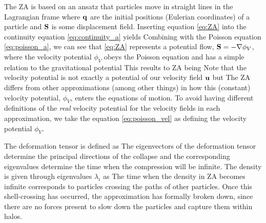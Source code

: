 The ZA is based on an ansatz that particles move in straight lines in the Lagrangian frame
where $\mathbf q$ are the initial positions (Eulerian coordinates) of a particle and $\mathbf S$ is some displacement field. Inserting equation \eqref{eq:ZA} into the continuity equation \eqref{eq:continuity_a} yields
Combining with the Poisson equation \eqref{eq:poisson_a}, we can see that \eqref{eq:ZA} represents a potential flow, $\mathbf S = -\nabla\phi_V$, where the velocity potential $\phi_V$ obeys the Poisson equation
and has a simple relation to the gravitational potential
This results to ZA being
Note that the velocity potential is not exactly a potential of our velocity field $\mathbf u$ but
The ZA differs from other approximations (among other things) in how this (constant) velocity potential, $\phi_V$, enters the equations of motion. To avoid having different definitions of the \textit{real} velocity potential for the velocity fields in each approximation, we take the equation \eqref{eq:poisson_vel} as defining the velocity potential $\phi_V$.

The deformation tensor is defined as
The eigenvectors of the deformation tensor determine the principal directions of the collapse and the corresponding eigenvalues determine the time when the compression will be infinite. The density is given through eigenvalues $\lambda_i$ as
The time when the density in ZA becomes infinite corresponds to particles crossing the paths of other particles. Once this shell-crossing has occurred, the approximation has formally broken down, since there are no forces present to slow down the particles and capture them within halos.

